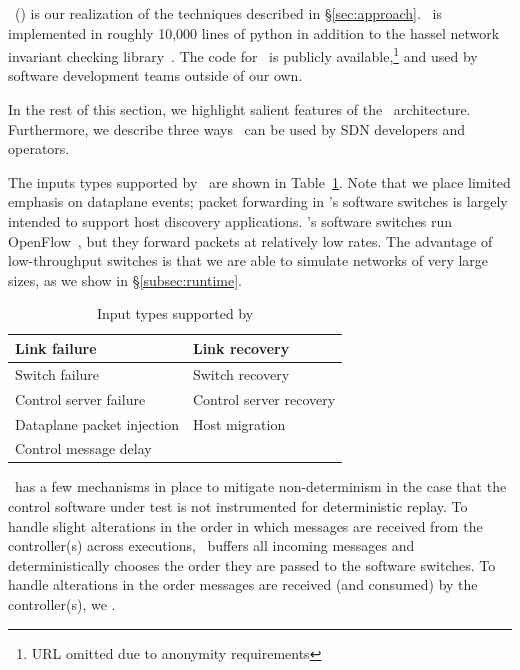 \projectname~(\projectmeaning) is our realization of the techniques described in
\S\ref{sec:approach}. \projectname~is implemented in roughly 10,000 lines of python in
addition to the hassel network invariant checking library~\cite{hsa}. The code
for \projectname~is publicly available,\footnote{URL omitted due to anonymity requirements}
and used by  software development teams outside of our own.

In the rest of this section, we highlight salient features of the
\projectname~architecture. Furthermore, we describe three ways \projectname~can be used
by SDN developers and operators.

The inputs types supported by \projectname~are shown in Table~\ref{tab:inputs}.
Note that we place limited emphasis on dataplane events; packet forwarding in
\projectname's software switches is largely intended to support host discovery
applications. \projectname's software switches run OpenFlow~\cite{openflow},
but they forward packets at relatively low rates.
The advantage of low-throughput switches is that we are able to simulate
networks of very large sizes, as we show in \S\ref{subsec:runtime}.

\begin{table}
\centering
\begin{tabular}{|l|l|}
\hline
Link failure & Link recovery \\
\hline
Switch failure & Switch recovery \\
\hline
Control server failure & Control server recovery \\
\hline
Dataplane packet injection & Host migration \\
\hline
Control message delay & \\
\hline
\end{tabular}
\caption{Input types supported by \projectname}
\label{tab:inputs}
\end{table}

\projectname~has a few mechanisms in place to mitigate non-determinism in the case that the
control software under test is not instrumented for deterministic replay.
To handle slight alterations in the order in which messages are received from the
controller(s) across executions, \projectname~buffers all incoming messages and
deterministically chooses the order they are
passed to the software switches. To handle alterations in the order messages
are received (and consumed) by the controller(s), we .


